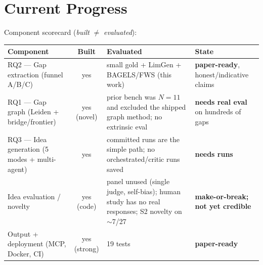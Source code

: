 \section{Current Progress}
\label{sec:progress}

Component scorecard (\emph{built} $\neq$ \emph{evaluated}):

\begin{table}[h]
\centering
\small
\begin{tabular}{@{}p{3.4cm}cp{4.2cm}p{3.6cm}@{}}
\toprule
\textbf{Component} & \textbf{Built} & \textbf{Evaluated} & \textbf{State} \\
\midrule
RQ2 --- Gap extraction (funnel A/B/C) & yes & small gold + LimGen + BAGELS/FWS (this work) & \textbf{paper-ready}, honest/indicative claims \\
RQ1 --- Gap graph (Leiden + bridge/frontier) & yes (novel) & prior bench was $N{=}11$ and excluded the shipped graph method; no extrinsic eval & \textbf{needs real eval} on hundreds of gaps \\
RQ3 --- Idea generation (5 modes + multi-agent) & yes & committed runs are the simple path; no orchestrated/critic runs saved & \textbf{needs runs} \\
Idea evaluation / novelty & yes (code) & panel unused (single judge, self-bias); human study has no real responses; S2 novelty on $\sim$7/27 & \textbf{make-or-break; not yet credible} \\
Output + deployment (MCP, Docker, CI) & yes (strong) & 19 tests & \textbf{paper-ready} \\
\bottomrule
\end{tabular}
\end{table}

